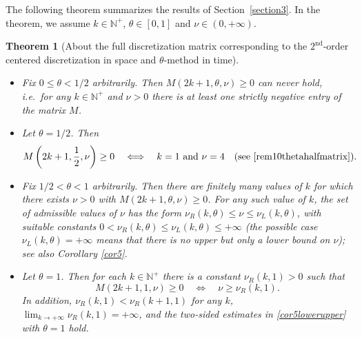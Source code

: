 \documentclass[smallextended,numbook,runningheads]{svjour3}     %
\newtheorem{theorem}{Theorem}
\newtheorem{theorem}{Theorem}
\newcommand{\te}{\theta}
\newcommand{\nul}{\nu_L(k,\theta)}
\newcommand{\nur}{\nu_R(k,\theta)}
\newcommand{\nplus}{\mathbb{N}^+}
\begin{document}
The following theorem summarizes the results of Section~\ref{section3}.
In the theorem, we assume $k\in\nplus$, $\te\in[0,1]$ and $\nu\in(0,+\infty)$.
\begin{theorem}[About the full discretization matrix corresponding to the $2^{\text{nd}}$-order centered discretization in space and $\theta$-method in time]\label{thm2}
\begin{itemize}\ 
\item[$\bullet$] Fix $0\le\te<1/2$ arbitrarily. Then  $M(2k+1,\te,\nu)\ge 0$ can never hold, i.e.~for any $k\in\nplus$ and $\nu>0$ there is at least one strictly negative entry of the matrix $M$.
\item[$\bullet$] Let $\te=1/2$. Then
\[
M\left(2k+1,\frac{1}{2},\nu\right)\ge 0\quad\Longleftrightarrow\quad k=1\text{ and } \nu=4\quad\text{(see }\eqref{rem10thetahalfmatrix}\text{)}.
\]
\item[$\bullet$] Fix $1/2<\te<1$ arbitrarily. Then there are finitely many values of $k$ for which there exists $\nu>0$ with $M(2k+1,\te,\nu)\ge 0$. For any such value of $k$, the set of admissible values of $\nu$ has the form $\nur\le\nu\le\nul$, with suitable constants $0<\nur\le\nul\le+\infty$ (the possible case $\nul=+\infty$ means that there is no upper but only a lower bound on $\nu$); see also Corollary \ref{cor5}.
\item[$\bullet$] Let $\te=1$. Then for each $k\in\nplus$ there is a constant $\nu_R(k,1)>0$ such that
\[
M(2k+1,1,\nu)\ge 0\quad\Longleftrightarrow\quad \nu\ge\nu_R(k,1).
\]
In addition, $\nu_R(k,1)<\nu_R(k+1,1)$ for any $k$, $\lim_{k\to+\infty} \nu_R(k,1)=+\infty$, and the two-sided estimates in \eqref{cor5lowerupper} with $\te=1$ hold.
\end{itemize}
\end{theorem}
\end{document}
